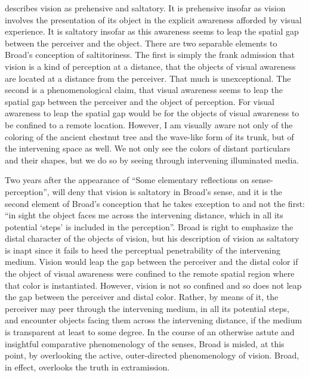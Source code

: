 \citet{Broad:1952kx} describes vision as prehensive and saltatory. It is prehensive insofar as vision involves the presentation of its object in the explicit awareness afforded by visual experience. It is saltatory insofar as this awareness seems to leap the spatial gap between the perceiver and the object. There are two separable elements to Broad's conception of saltitoriness. The first is simply the frank admission that vision is a kind of perception at a distance, that the objects of visual awareness are located at a distance from the perceiver. That much is unexceptional. The second is a phenomenological claim, that visual awareness seems to leap the spatial gap between the perceiver and the object of perception. For visual awareness to leap the spatial gap would be for the objects of visual awareness to be confined to a remote location. However, I am visually aware not only of the coloring of the ancient chestnut tree and the wave-like form of its trunk, but of the intervening space as well. We not only see the colors of distant particulars and their shapes, but we do so by seeing through intervening illuminated media.

Two years after the appearance of ``Some elementary reflections on sense-per\-cep\-tion'', \citet[518]{Jonas:1954aa} will deny that vision is saltatory in Broad’s sense, and it is the second element of Broad's conception that he takes exception to and not the first: ``in sight the object faces me across the intervening distance, which in all its potential `steps' is included in the perception''. Broad is right to emphasize the distal character of the objects of vision, but his description of vision as saltatory is inapt since it fails to heed the perceptual penetrability of the intervening medium. Vision would leap the gap between the perceiver and the distal color if the object of visual awareness were confined to the remote spatial region where that color is instantiated. However, vision is not so confined and so does not leap the gap between the perceiver and distal color. Rather, by means of it, the perceiver may peer through the intervening medium, in all its potential steps, and encounter objects facing them across the intervening distance, if the medium is transparent at least to some degree. In the course of an otherwise astute and insightful comparative phenomenology of the senses, Broad is misled, at this point, by overlooking the active, outer-directed phenomenology of vision. Broad, in effect, overlooks the truth in extramission.

